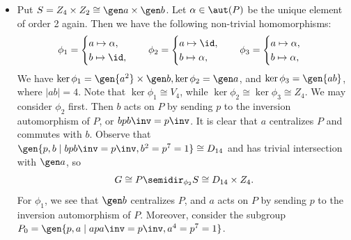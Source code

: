 \begin{solenum}[spsol]
\begin{itemize}
\[        \]
        Note that $\ker\phi_1 = \gen b \times \gen c$, $\ker\phi_2 = \gen{ab, c}$, and $\ker\phi_3 = \gen{ab, ac}$.
        Note that these are all isomorphic to $V_4$, hence the resulting semidirect products are isomorphic by .
        Without loss of generality, consider $\phi_1$.
        Then $a$ acts on $P$ by sending $p$ to the inversion automorphism of $P$, or $apa\inv = p\inv$.
        It is clear that $b$ and $c$ centralize $P$ and commute with $a$.
        Observe that $\gen{p, a \mid apa\inv = p\inv, a^2 = p^7 = 1} \cong D_{14}$ and has trivial intersection with $\gen b \times \gen c$, so
        \[
        	G \cong P \semidir_{\phi_1} S \cong D_{14} \times Z_2 \times Z_2.
        \]
        \item Put $S = Z_4 \times Z_2 \cong \gen a \times \gen b$.
        Let $\alpha \in \aut(P)$ be the unique element of order 2 again.
        Then we have the following non-trivial homomorphisms:
        \[
        	\phi_1 =
            \begin{cases}
                a \mapsto \alpha, \\
                b \mapsto \id,
            \end{cases} \quad
            \phi_2 = 
            \begin{cases}
                a \mapsto \id, \\
                b \mapsto \alpha,
            \end{cases} \quad
            \phi_3 =
            \begin{cases}
                a \mapsto \alpha, \\
                b \mapsto \alpha,
            \end{cases}
        \]
        We have $\ker\phi_1 = \gen{a^2} \times \gen b, \ker\phi_2 = \gen a$, and $\ker\phi_3 = \gen{ab}$, where $|ab| = 4$.
        Note that $\ker\phi_1 \cong V_4$, while $\ker\phi_2 \cong \ker\phi_3 \cong Z_4$.
        We may consider $\phi_2$ first.
        Then $b$ acts on $P$ by sending $p$ to the inversion automorphism of $P$, or $bpb\inv = p\inv$.
        It is clear that $a$ centralizes $P$ and commutes with $b$.
        Observe that $\gen{p, b \mid bpb\inv = p\inv, b^2 = p^7 = 1} \cong D_{14}$ and has trivial intersection with $\gen a$, so
        \[
        	G \cong P \semidir_{\phi_2} S \cong D_{14} \times Z_4.
        \]
        For $\phi_1$, we see that $\gen b$ centralizes $P$, and $a$ acts on $P$ by sending $p$ to the inversion automorphism of $P$.
        Moreover, consider the subgroup $P_0 = \gen{p, a \mid apa\inv = p\inv, a^4 = p^7 = 1}$.

\end{itemize}
\end{solenum}
